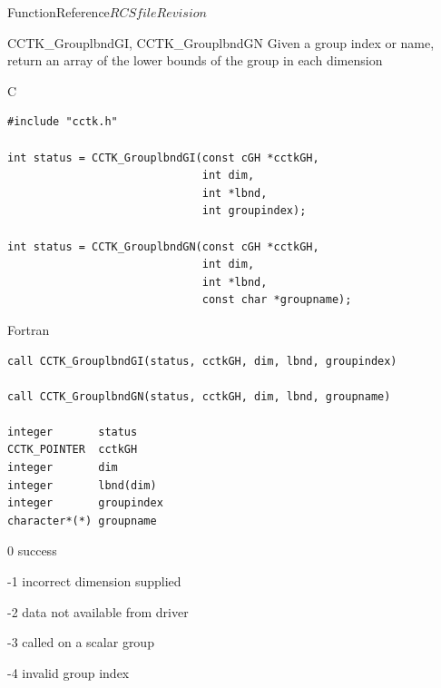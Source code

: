 \begin{cactuspart}{FunctionReference}{$RCSfile$}{$Revision$}
\begin{FunctionDescription}{CCTK\_GrouplbndGI, CCTK\_GrouplbndGN}
\label{CCTK-GrouplbndGI}
\label{CCTK-GrouplbndGN}
Given a group index or name, return an array of the lower bounds of the group in each dimension

\begin{SynopsisSection}
\begin{Synopsis}{C}
\begin{verbatim}
#include "cctk.h"

int status = CCTK_GrouplbndGI(const cGH *cctkGH,
                              int dim,
                              int *lbnd,
                              int groupindex);

int status = CCTK_GrouplbndGN(const cGH *cctkGH,
                              int dim,
                              int *lbnd,
                              const char *groupname);
\end{verbatim}
\end{Synopsis}
\begin{Synopsis}{Fortran}
\begin{verbatim}
call CCTK_GrouplbndGI(status, cctkGH, dim, lbnd, groupindex)

call CCTK_GrouplbndGN(status, cctkGH, dim, lbnd, groupname)

integer       status
CCTK_POINTER  cctkGH
integer       dim
integer       lbnd(dim)
integer       groupindex
character*(*) groupname
\end{verbatim}
\end{Synopsis}
\end{SynopsisSection}

\begin{ResultSection}
\begin{Result}{\rm 0} success \end{Result}
\begin{Result}{\rm -1} incorrect dimension supplied \end{Result}
\begin{Result}{\rm -2} data not available from driver \end{Result}
\begin{Result}{\rm -3} called on a scalar group \end{Result}
\begin{Result}{\rm -4} invalid group index \end{Result}
\end{ResultSection}


\end{FunctionDescription}
\end{cactuspart}
